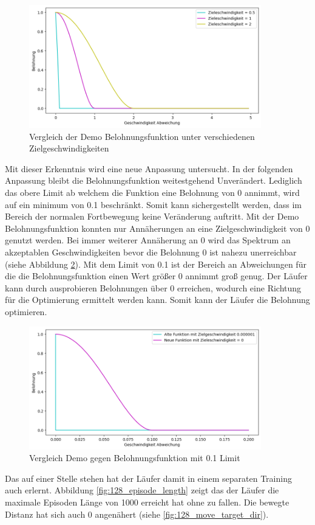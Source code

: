 \begin{figure}[H]
  \centering  
  \includegraphics[width=0.9\textwidth]{img/match_velocity_demo_vergleich}
  \caption{Vergleich der Demo Belohnungsfunktion unter verschiedenen Zielgeschwindigkeiten}
  \label{fig:match_velocity_demo_vergleich}
\end{figure}

Mit dieser Erkenntnis wird eine neue Anpassung untersucht. In der folgenden Anpassung bleibt die Belohnungsfunktion weitestgehend Unverändert. Lediglich das obere Limit ab welchem die Funktion eine Belohnung von 0 annimmt, wird auf ein minimum von 0.1 beschränkt. Somit kann sichergestellt werden, dass im Bereich der normalen Fortbewegung keine Veränderung auftritt. Mit der Demo Belohnungsfunktion konnten nur Annäherungen an eine Zielgeschwindigkeit von 0 genutzt werden. Bei immer weiterer Annäherung an 0 wird das Spektrum an akzeptablen Geschwindigkeiten bevor die Belohnung 0 ist nahezu unerreichbar (siehe Abbildung \ref{fig:match_velocity_vergleich_clip}). Mit dem Limit von 0.1 ist der Bereich an Abweichungen für die die Belohnungsfunktion einen Wert größer 0 annimmt groß genug. Der Läufer kann durch ausprobieren Belohnungen über 0 erreichen, wodurch eine Richtung für die Optimierung ermittelt werden kann. Somit kann der Läufer die Belohnung optimieren.\\

\begin{figure}[H]
  \centering  
  \includegraphics[width=0.9\textwidth]{img/match_velocity_vergleich_clip}
  \caption{Vergleich Demo gegen Belohnungsfunktion mit 0.1 Limit}
  \label{fig:match_velocity_vergleich_clip}
\end{figure}
Das auf einer Stelle stehen hat der Läufer damit in einem separaten Training auch erlernt. Abbildung \ref{fig:128_episode_length} zeigt das der Läufer die maximale Episoden Länge von 1000 erreicht hat ohne zu fallen. Die bewegte Distanz hat sich auch 0 angenähert (siehe \ref{fig:128_move_target_dir}).


